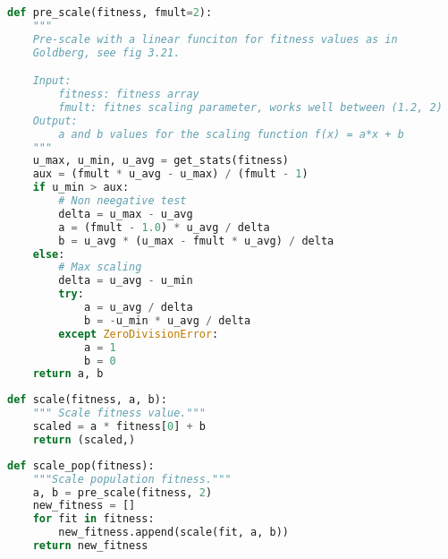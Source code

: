 
\begin{lstlisting}[float,language=Python,label=lst:label,caption=falta]
def pre_scale(fitness, fmult=2):
    """
    Pre-scale with a linear funciton for fitness values as in
    Goldberg, see fig 3.21.

    Input:
        fitness: fitness array
        fmult: fitnes scaling parameter, works well between (1.2, 2)
    Output:
        a and b values for the scaling function f(x) = a*x + b
    """
    u_max, u_min, u_avg = get_stats(fitness)
    aux = (fmult * u_avg - u_max) / (fmult - 1)
    if u_min > aux:
        # Non neegative test
        delta = u_max - u_avg
        a = (fmult - 1.0) * u_avg / delta
        b = u_avg * (u_max - fmult * u_avg) / delta
    else:
        # Max scaling
        delta = u_avg - u_min
        try:
            a = u_avg / delta
            b = -u_min * u_avg / delta
        except ZeroDivisionError:
            a = 1
            b = 0
    return a, b
\end{lstlisting}

\begin{lstlisting}[float,language=Python,label=lst:label,caption=falta]
def scale(fitness, a, b):
    """ Scale fitness value."""
    scaled = a * fitness[0] + b
    return (scaled,)
\end{lstlisting}





\begin{lstlisting}[float,language=Python,label=lst:label,caption=falta]
def scale_pop(fitness):
    """Scale population fitness."""
    a, b = pre_scale(fitness, 2)
    new_fitness = []
    for fit in fitness:
        new_fitness.append(scale(fit, a, b))
    return new_fitness
\end{lstlisting}



